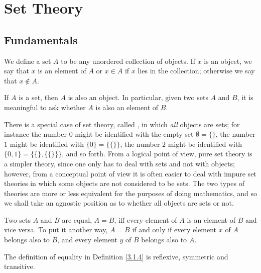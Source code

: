 \chapter{Set Theory}
\section{Fundamentals}

\begin{definition}\label{3.1.1}
We define a set \(A\) to be any unordered collection of objects.
If \(x\) is an object, we say that \(x\) is an element of \(A\) or \(x \in A\) if \(x\) lies in the collection;
otherwise we say that \(x \notin A\).
\end{definition}

\begin{axiom}\label{3.1}
If \(A\) is a set, then \(A\) is also an object.
In particular, given two sets \(A\) and \(B\), it is meaningful to ask whether \(A\) is also an element of \(B\).
\end{axiom}

\setcounter{theorem}{2}
\begin{remark}\label{3.1.3}
There is a special case of set theory, called , in which \emph{all} objects are sets;
for instance the number \(0\) might be identified with the empty set \(\emptyset = \{\}\), the number \(1\) might be identified with \(\{0\} = \{\{\}\}\), the number \(2\) might be identified with \(\{0, 1\} = \{\{\}, \{\{\}\}\}\), and so forth.
From a logical point of view, pure set theory is a simpler theory, since one only has to deal with sets and not with objects;
however, from a conceptual point of view it is often easier to deal with impure set theories in which some objects are not considered to be sets.
The two types of theories are more or less equivalent for the purposes of doing mathematics, and so we shall take an agnostic position as to whether all objects are sets or not.
\end{remark}

\begin{definition}\label{3.1.4}
Two sets \(A\) and \(B\) are equal, \(A = B\), iff every element of \(A\) is an element of \(B\) and vice versa.
To put it another way, \(A = B\) if and only if every element \(x\) of \(A\) belongs also to \(B\), and every element \(y\) of \(B\) belongs also to \(A\).
\end{definition}

\begin{additional corollary}\label{ac 3.1.1}
The definition of equality in Definition \ref{3.1.4} is reflexive, symmetric and transitive.
\end{additional corollary}


